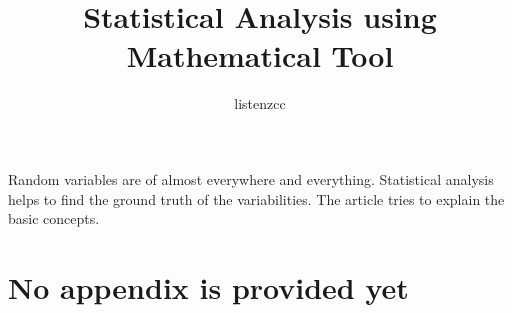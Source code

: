 \documentclass[a4paper]{article}
\title{Statistical Analysis using Mathematical Tool}
\author{listenzcc}
\begin{document}
\maketitle

\abstract
Random variables are of almost everywhere and everything.
Statistical analysis helps to find the ground truth of the variabilities.
The article tries to explain the basic concepts.

\tableofcontents



\appendix
\section{No appendix is provided yet}
\end{document}
